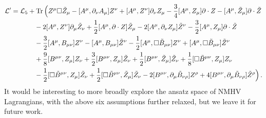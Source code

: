 \documentclass[11pt,a4paper]{article}
\begin{document}
\begin{align}\label{eq:complete2}
\mathcal{L}'  = \mathcal{L}_5 &+ \text{Tr} \, \Big(  Z^\mu \Box \tilde{Z}_\mu - [A^\mu ,\partial_\nu A_\mu] Z^\nu + [A^\mu, Z^\nu ]\partial_\nu Z_\mu -\frac{3}{4} [A^\mu, Z_\mu] \partial \cdot Z - [A^\mu, \tilde{Z}_\mu] \partial \cdot \tilde{Z}   \notag \\
%
& \quad -2 [A^\mu, Z^\nu] \partial_\mu \tilde{Z}_\nu + \frac{1}{2} [A^\mu, \partial \cdot Z] \tilde{Z}_\mu -2 [A^\mu, \partial_\nu Z_\mu ]\tilde{Z}^\nu - \frac{3}{2} [A^\mu, Z_\mu] \partial \cdot \tilde{Z}  \notag \\
& \quad -\frac{3}{2} [A^\mu, B_{\mu \nu}] Z^\nu - [A^\mu, B_{\mu \nu}] \tilde{Z}^\nu - \frac{1}{2} [A^\mu, \Box \tilde{B}_{\mu \nu}] Z^\nu + [A^\mu, \Box \tilde{B}_{\mu \nu}] \tilde{Z}^\nu  \notag \\
%
& \quad + \frac{9}{8} [B^{\mu \nu}, Z_\mu ]Z_\nu  + \frac{3}{2} [B^{\mu \nu} ,Z_\mu] \tilde{Z}_\nu + \frac{1}{2} [B^{\mu \nu}, \tilde{Z}_\mu ]\tilde{Z}_\nu + \frac{1}{8} [\Box \tilde{B}^{\mu \nu}, Z_\mu] Z_\nu \notag \\
%
& \quad - \frac{1}{2} [\Box \tilde{B}^{\mu \nu}, Z_\mu] \tilde{Z}_\nu  \notag + \frac{1}{2} [\Box \tilde{B}^{\mu \nu} ,\tilde{Z}_\mu ]\tilde{Z}_\nu -2 [B^{\mu \nu}, \partial_\mu \tilde{B}_{\nu \rho}] Z^\rho + 4 [B^{\mu \nu} ,\partial_\mu \tilde{B}_{\nu \rho} ]\tilde{Z}^\rho \Big) \, . \\
\end{align}
It would be interesting to more broadly explore the ansatz space of NMHV Lagrangians, with the above six assumptions further relaxed, but we leave it for future work.  
\end{document}

